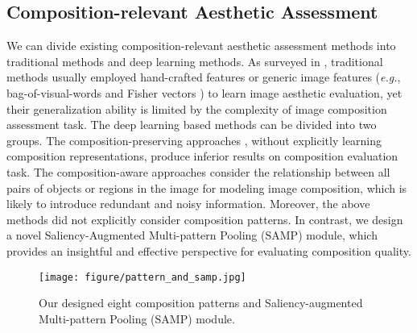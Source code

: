 \documentclass{bmvc2k}
\begin{document}
\subsection{Composition-relevant Aesthetic Assessment}
 We can divide existing composition-relevant aesthetic assessment methods into traditional methods and deep learning methods. 
 As surveyed in \cite{Deng2017ImageAA, brachmann2017computational}, traditional methods \cite{liu2010optimizing,Tang2013ContentBasedPQ, Bhattacharya2010AFF, Zhang2014FusionOM, Murray2012AVAAL, Zhou2015ModelingPE,Su2011ScenicPQ, Li2010AestheticQA, wu2010good,Marchesotti2011AssessingTA,obrador2010role,savakis2000evaluation,rawat2015context} usually employed hand-crafted features or generic image features (\emph{e.g.}, bag-of-visual-words \cite{Su2011ScenicPQ} and Fisher vectors \cite{Perronnin2007FisherKO}) to learn image aesthetic evaluation, yet their generalization ability is limited by the complexity of image composition assessment task.
The deep learning based methods can be divided into two groups. The composition-preserving approaches \cite{Mai2016CompositionPreservingDP, Chen2020AdaptiveFD}, without explicitly learning composition representations, produce inferior results on composition evaluation task.
 The composition-aware approaches \cite{Liu2020CompositionAwareIA, Ma2017ALampAL, Wang2019ModelingHP} consider the relationship between all pairs of objects or regions in the image for modeling image composition, which is likely to introduce redundant and noisy information.
Moreover, the above methods did not explicitly consider composition patterns. In contrast, we design a novel Saliency-Augmented Multi-pattern Pooling (SAMP) module, which provides an insightful and effective perspective for evaluating composition quality.

\begin{figure}[tbp]
\begin{center}
  \texttt{[image: figure/pattern\_and\_samp.jpg]}
\end{center}
  \vspace{-6mm}
  \caption{Our designed eight composition patterns and Saliency-augmented Multi-pattern Pooling (SAMP) module.}
  \vspace{-4mm}
\label{fig:pattern_and_samp}
\end{figure}
\end{document}
